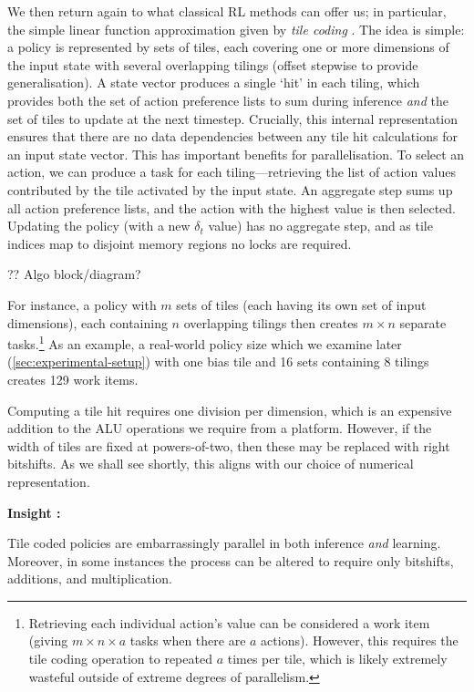 \documentclass[sigconf,natbib=false]{acmart}
\newcounter{insightc}
\newenvironment{insight}
	{
		\begin{tipblock}\refstepcounter{insightc}\textbf{Insight \theinsightc:}\em
	}
	{
		\end{tipblock}
	}
\begin{document}
We then return again to what classical RL methods can offer us; in particular, the simple linear function approximation given by \emph{tile coding} \cite[pp.\ \numrange{217}{221}]{RL2E}.
The idea is simple: a policy is represented by sets of tiles, each covering one or more dimensions of the input state with several overlapping tilings (offset stepwise to provide generalisation).
A state vector produces a single `hit' in each tiling, which provides both the set of action preference lists to sum during inference \emph{and} the set of tiles to update at the next timestep.
Crucially, this internal representation ensures that there are no data dependencies between any tile hit calculations for an input state vector.
This has important benefits for parallelisation.
To select an action, we can produce a task for each tiling---retrieving the list of action values contributed by the tile activated by the input state.
An aggregate step sums up all action preference lists, and the action with the highest value is then selected.
Updating the policy (with a new $\delta_t$ value) has no aggregate step, and as tile indices map to disjoint memory regions no locks are required.

?? Algo block/diagram?

For instance, a policy with $m$ sets of tiles (each having its own set of input dimensions), each containing $n$ overlapping tilings then creates $m \times n$ separate tasks.\footnote{Retrieving each individual action's value can be considered a work item (giving $m \times n \times a$ tasks when there are $a$ actions). However, this requires the tile coding operation to repeated $a$ times per tile, which is likely extremely wasteful outside of extreme degrees of parallelism.}
As an example, a real-world policy size which we examine later (\cref{sec:experimental-setup}) with one bias tile and \num{16} sets containing \num{8} tilings creates \num{129} work items.

Computing a tile hit requires one division per dimension, which is an expensive addition to the ALU operations we require from a platform.
However, if the width of tiles are fixed at powers-of-two, then these may be replaced with right bitshifts.
As we shall see shortly, this aligns with our choice of numerical representation.

\begin{insight}
	Tile coded policies are embarrassingly parallel in both inference \emph{and} learning. Moreover, in some instances the process can be altered to require only bitshifts, additions, and multiplication.
\end{insight}
\end{document}
